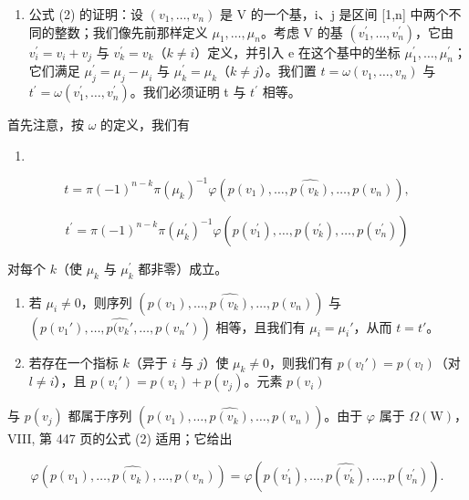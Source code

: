 \begin{enumerate}
\def\labelenumi{\Alph{enumi})}
\setcounter{enumi}{3}
\tightlist
\item
  公式 (2) 的证明：设 \((v_{1},\ldots,v_{n})\) 是 V 的一个基，i、j 是区间 {[}1,n{]} 中两个不同的整数；我们像先前那样定义 \(\mu_{1},\ldots,\mu_{n}\)。考虑 V 的基 \((v_{1}^{\prime},\ldots,v_{n}^{\prime})\)，它由 \(v_{i}^{\prime}=v_{i}+v_{j}\) 与 \(v_{k}^{\prime}=v_{k}\)（\(k\neq i\)）定义，并引入 e 在这个基中的坐标 \(\mu_{1}^{\prime},\ldots,\mu_{n}^{\prime}\)；它们满足 \(\mu_{j}^{\prime}=\mu_{j}-\mu_{i}\) 与 \(\mu_{k}^{\prime}=\mu_{k}\)（\(k\neq j\)）。我们置 \(t=\omega(v_{1},\ldots,v_{n})\) 与 \(t^{\prime}=\omega(v_{1}^{\prime},\ldots,v_{n}^{\prime})\)。我们必须证明 t 与 \(t^{\prime}\) 相等。
\end{enumerate}

首先注意，按 \(\omega\) 的定义，我们有

\begin{enumerate}
\def\labelenumi{(\arabic{enumi})}
\setcounter{enumi}{11}
\tightlist
\item
\end{enumerate}

\[
t = \pi (- 1) ^ {n - k} \pi (\mu_ {k}) ^ {- 1} \varphi (p (v _ {1}), \ldots , \widehat {p (v _ {k})}, \ldots , p (v _ {n})),\tag{13}
\]

\[
t ^ {\prime} = \pi (- 1) ^ {n - k} \pi (\mu_ {k} ^ {\prime}) ^ {- 1} \varphi (p (v _ {1} ^ {\prime}), \ldots , \widehat {p (v _ {k} ^ {\prime})}, \ldots , p (v _ {n} ^ {\prime}))
\]

对每个 \(k\)（使 \(\mu_{k}\) 与 \(\mu_k^\prime\) 都非零）成立。

\begin{enumerate}
\def\labelenumi{\alph{enumi})}
\item
  若 \(\mu_i \neq 0\)，则序列 \((p(v_1), \ldots, \widehat{p(v_k)}, \ldots, p(v_n))\) 与 \((p(v_1'), \ldots, \widehat{p(v_k'}, \ldots, p(v_n'))\) 相等，且我们有 \(\mu_i = \mu_i'\)，从而 \(t = t'\)。
\item
  若存在一个指标 \(k\)（异于 \(i\) 与 \(j\)）使 \(\mu_k \neq 0\)，则我们有 \(p(v_l') = p(v_l)\)（对 \(l \neq i\)），且 \(p(v_i') = p(v_i) + p(v_j)\)。元素 \(p(v_i)\)
\end{enumerate}

与 \(p(v_{j})\) 都属于序列 \((p(v_{1}),\ldots ,\widehat{p(v_{k})},\ldots ,p(v_{n}))\)。由于 \(\varphi\) 属于 \(\Omega (\mathrm{W})\)，VIII, 第 447 页的公式 (2) 适用；它给出

\[
\varphi (p (v _ {1}), \dots , \widehat {p (v _ {k})}, \dots , p (v _ {n})) = \varphi (p (v _ {1} ^ {\prime}), \dots , \widehat {p (v _ {k} ^ {\prime})}, \dots , p (v _ {n} ^ {\prime})).
\]

